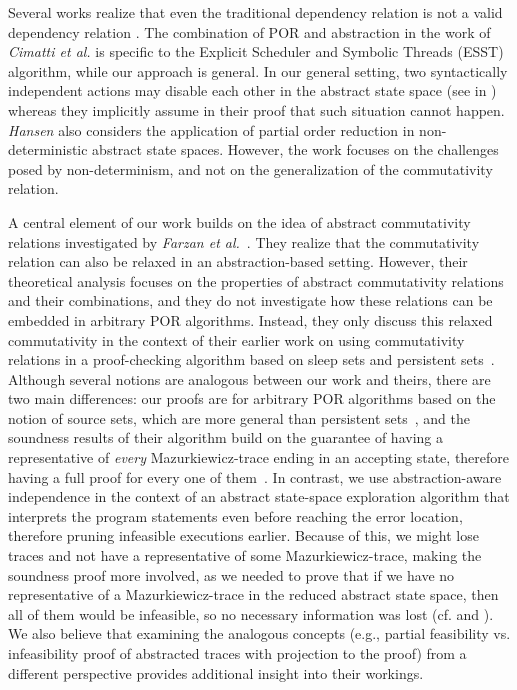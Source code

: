 \documentclass[numbook]{svjour3}
\begin{document}
Several works realize that even the traditional dependency relation is not a valid dependency relation \cite{fbk_por_abstraction, sousa_abstractions_independence}. The combination of POR and abstraction in the work of \emph{Cimatti et al.} \cite{fbk_por_abstraction} is specific to the Explicit Scheduler and Symbolic Threads (ESST) algorithm, while our approach is general. In our general setting, two syntactically independent actions may disable each other in the abstract state space (see  in ) whereas they implicitly assume in their proof that such situation cannot happen. \emph{Hansen} \cite{hansen_abstractions_por_nondet} also considers the application of partial order reduction in non-deterministic abstract state spaces. However, the work focuses on the challenges posed by non-determinism, and not on the generalization of the commutativity relation.

A central element of our work builds on the idea of abstract commutativity relations investigated by \emph{Farzan et al.}~\cite{farzan_stratified_commutativity}. They realize that the commutativity relation can also be relaxed in an abstraction-based setting. However, their theoretical analysis focuses on the properties of abstract commutativity relations and their combinations, and they do not investigate how these relations can be embedded in arbitrary POR algorithms. Instead, they only discuss this relaxed commutativity in the context of their earlier work on using commutativity relations in a proof-checking algorithm based on sleep sets and persistent sets~\cite{farzan_sound_sequentialization}. Although several notions are analogous between our work and theirs, there are two main differences: our proofs are for arbitrary POR algorithms based on the notion of source sets, which are more general than persistent sets~\cite{source_persistent}, and the soundness results of their algorithm build on the guarantee of having a representative of \emph{every} Mazurkiewicz-trace ending in an accepting state, therefore having a full proof for every one of them~\cite{farzan_stratified_commutativity}. In contrast, we use abstraction-aware independence in the context of an abstract state-space exploration algorithm that interprets the program statements even before reaching the error location, therefore pruning infeasible executions earlier. Because of this, we might lose traces and not have a representative of some Mazurkiewicz-trace, making the soundness proof more involved, as we needed to prove that if we have no representative of a Mazurkiewicz-trace in the reduced abstract state space, then all of them would be infeasible, so no necessary information was lost (cf.  and ). We also believe that examining the analogous concepts (e.g., partial feasibility vs. infeasibility proof of abstracted traces with projection to the proof) from a different perspective provides additional insight into their workings.
\end{document}
